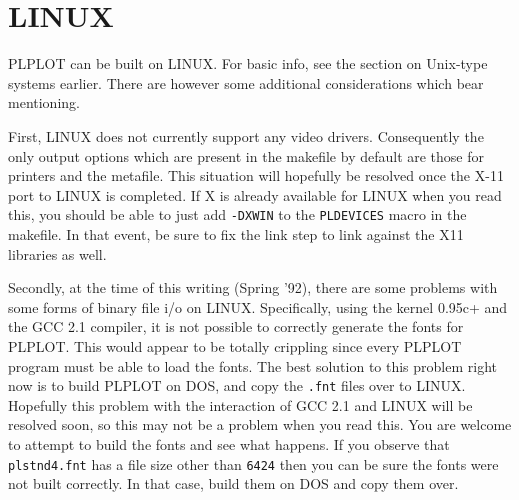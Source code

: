 \section{LINUX}

PLPLOT can be built on LINUX.  For basic info, see the section on Unix-type
systems earlier.  There are however some additional considerations which
bear mentioning.

First, LINUX does not currently support any video drivers.  Consequently the
only output options which are present in the makefile by default are those
for printers and the metafile.  This situation will hopefully be resolved
once the X-11 port to LINUX is completed.  If X is already available for
LINUX when you read this, you should be able to just add {\tt -DXWIN} to
the {\tt PLDEVICES} macro in the makefile.  In that event, be sure to fix
the link step to link against the X11 libraries as well.

Secondly, at the time of this writing (Spring '92), there are some problems
with some forms of binary file i/o on LINUX.  Specifically, using the
kernel 0.95c+ and the GCC 2.1 compiler, it is not possible to correctly
generate the fonts for PLPLOT.  This would appear to be totally crippling
since every PLPLOT program must be able to load the fonts.  The best
solution to this problem right now is to build PLPLOT on DOS, and copy the
{\tt *.fnt} files over to LINUX.  Hopefully this problem with the
interaction of GCC 2.1 and LINUX will be resolved soon, so this may not be
a problem when you read this.  You are welcome to attempt to build the
fonts and see what happens.  If you observe that {\tt plstnd4.fnt} has a
file size other than {\tt 6424} then you can be sure the fonts were not
built correctly.  In that case, build them on DOS and copy them over.
